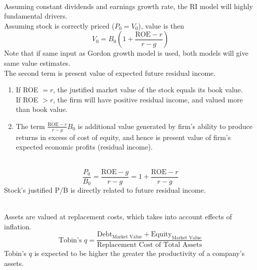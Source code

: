 \begin{remark} \\
Assuming constant dividends and earnings growth rate, the RI model will highly fundamental drivers.\\
Assuming stock is correctly priced ($P_0 = V_0$), value is then
\begin{equation}
V_0 = B_0 \left(1 + \frac{\text{ROE} - r}{r - g} \right) \nonumber
\end{equation}
Note that if same input as Gordon growth model is used, both models will give same value estimates.\\
The second term is present value of expected future residual income.
\begin{enumerate}[label=\roman*.]
\setlength{\itemsep}{0pt}
\item If ROE $= r$, the justified market value of the stock equals its book value.\\
If ROE $> r$, the firm will have positive residual income, and valued more than book value.
\item The term $\frac{\text{ROE} - r}{r - g} B_0$ is additional value generated by firm's ability to produce returns in excess of cost of equity, and hence is present value of firm's expected economic profits (residual income).
\end{enumerate}
\end{remark}

\begin{remark} \\
\begin{equation}
\frac{P_0}{B_0} =\frac{\text{ROE} - g}{r - g} = 1 + \frac{\text{ROE} - r}{r - g} \nonumber
\end{equation}
Stock's justified P/B is directly related to future residual income.
\end{remark}

\begin{definition} \\
Assets are valued at replacement costs, which takes into account effects of inflation.
\begin{equation}
\text{Tobin's } q = \frac{\text{Debt}_{\text{Market Value}} + \text{Equity}_{\text{Market Value}}}{\text{Replacement Cost of Total Assets}} \nonumber
\end{equation}
Tobin's $q$ is expected to be higher the greater the productivity of a company's assets.
\end{definition}

